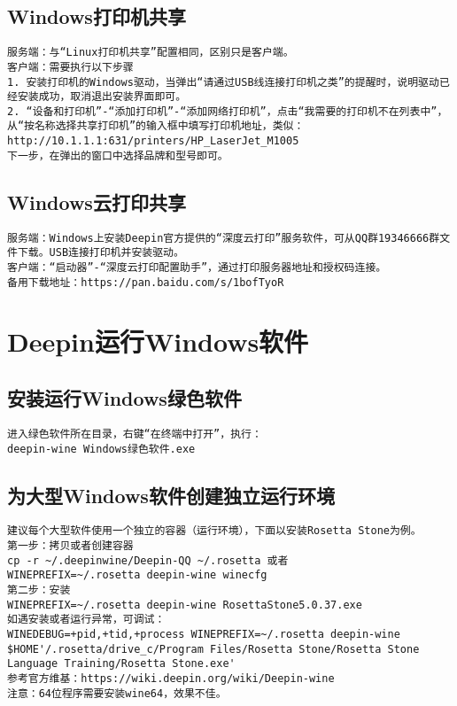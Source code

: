 \documentclass[a4paper,fontset=fandol,zihao=-4,linespread=1.2]{ctexbook}
\begin{document}
\section{Windows打印机共享}
\begin{lstlisting}
服务端：与“Linux打印机共享”配置相同，区别只是客户端。
客户端：需要执行以下步骤
1. 安装打印机的Windows驱动，当弹出“请通过USB线连接打印机之类”的提醒时，说明驱动已经安装成功，取消退出安装界面即可。
2. “设备和打印机”-“添加打印机”-“添加网络打印机”，点击“我需要的打印机不在列表中”，从“按名称选择共享打印机”的输入框中填写打印机地址，类似：
http://10.1.1.1:631/printers/HP_LaserJet_M1005
下一步，在弹出的窗口中选择品牌和型号即可。
\end{lstlisting}

\section{Windows云打印共享}
\begin{lstlisting}
服务端：Windows上安装Deepin官方提供的“深度云打印”服务软件，可从QQ群19346666群文件下载。USB连接打印机并安装驱动。
客户端：“启动器”-“深度云打印配置助手”，通过打印服务器地址和授权码连接。
备用下载地址：https://pan.baidu.com/s/1bofTyoR
\end{lstlisting}


\chapter{Deepin运行Windows软件}

\section{安装运行Windows绿色软件}
\begin{lstlisting}
进入绿色软件所在目录，右键“在终端中打开”，执行：
deepin-wine Windows绿色软件.exe
\end{lstlisting}

\section{为大型Windows软件创建独立运行环境}
\begin{lstlisting}
建议每个大型软件使用一个独立的容器（运行环境），下面以安装Rosetta Stone为例。
第一步：拷贝或者创建容器
cp -r ~/.deepinwine/Deepin-QQ ~/.rosetta 或者
WINEPREFIX=~/.rosetta deepin-wine winecfg
第二步：安装
WINEPREFIX=~/.rosetta deepin-wine RosettaStone5.0.37.exe
如遇安装或者运行异常，可调试：
WINEDEBUG=+pid,+tid,+process WINEPREFIX=~/.rosetta deepin-wine $HOME'/.rosetta/drive_c/Program Files/Rosetta Stone/Rosetta Stone Language Training/Rosetta Stone.exe'
参考官方维基：https://wiki.deepin.org/wiki/Deepin-wine
注意：64位程序需要安装wine64，效果不佳。
\end{lstlisting}
\end{document}
